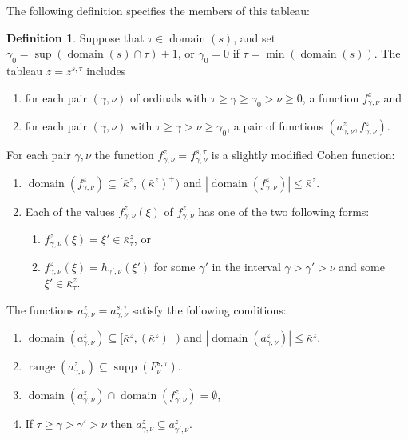 \documentclass[
twoside,
]{article}
\theoremstyle{definition}
\newtheorem{definition}[theorem]{Definition}
\theoremstyle{remark}
\newcommand{\forceKappa}{\bar\kappa} %
\DeclareMathOperator{\supp}{supp}   %
\newcommand{\card}[1]{|#1|}
\DeclareMathOperator{\range}{range}
\DeclareMathOperator{\domain}{domain}
\begin{document}
The following definition specifies the
members of this tableau:

\begin{definition}\label{def:tableau}
Suppose that $\tau\in\domain(s)$, and set
$\gamma_0=\sup(\domain(s)\cap\tau)+1$, or $\gamma_0=0$ if
$\tau=\min(\domain(s))$.  The tableau $z=z^{s,\tau}$ includes 
\begin{enumerate}
    \item for each pair $(\gamma,\nu)$ of ordinals
with  $\tau\ge\gamma\geq\gamma_0>\nu\geq0$, a function
$f^{z}_{\gamma,\nu}$ and 
\item for each pair  $(\gamma,\nu)$ with
$\tau\ge\gamma>\nu\geq\gamma_0$, a pair of functions
$(a^{z}_{\gamma,\nu}, f^{z}_{\gamma,\nu})$.
\end{enumerate}
For each pair $\gamma,\nu$ the function $f^z_{\gamma,\nu}=f^{s,\tau}_{\gamma,\nu}$ is a
slightly modified Cohen function:
\begin{enumerate}
    \item $\domain(
      f^{z}_{\gamma,\nu})\subseteq[\forceKappa^{z},(\forceKappa^z)^{+})$
      and $\card{\domain(f^{z}_{\gamma,\nu})}\leq\forceKappa^z$.
\item Each of the values $f^z_{\gamma,\nu}(\xi)$ of $f^z_{\gamma,\nu}$
  has  one of the two following forms:
\begin{enumerate}
\item $f^{z}_{\gamma,\nu}(\xi)=\xi'\in \forceKappa^z_{\tau}$, or
\item\label{item:fpeculiar} $f^{z}_{\gamma,\nu}(\xi)=h_{\gamma',\nu}(\xi')$ for some
  $\gamma'$ in the interval $\gamma>\gamma'>\nu$ and some
  $\xi'\in\forceKappa^z_{\tau}$.
\end{enumerate}
\end{enumerate}
The functions $a^{z}_{\gamma,\nu}=a^{s,\tau}_{\gamma,\nu}$ satisfy the following conditions:
\begin{enumerate}
\item 
  $\domain( a^{z}_{\gamma,\nu})\subseteq[\forceKappa^{z},(\forceKappa^z)^{+})$
  and
  $\card{\domain(a^{z}_{\gamma,\nu})}\leq\forceKappa^z$.    
\item
  $\range(a^{z}_{\gamma,\nu})\subseteq\supp(F^{s,\tau}_{\nu})$. 
\item $\domain(a^{z}_{\gamma,\nu})\cap\domain(f^z_{\gamma,\nu})=\emptyset$, 
\item\label{item:asubset} If $\tau\geq\gamma>\gamma'>\nu$ then
    $a^{z}_{\gamma,\nu}\subseteq a^{z}_{\gamma',\nu}$.
    
\end{enumerate}
\end{definition}
\end{document}
